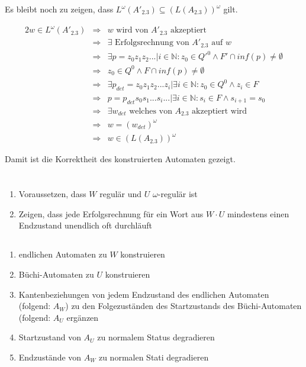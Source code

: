 \documentclass[10pt,a4paper,oneside,ngerman,numbers=noenddot]{scrartcl}
\begin{document}
	Es bleibt noch zu zeigen, dass \(L^{\omega}(A'_{2.3}) \subseteq (L(A_{2.3}))^{\omega}\) gilt.
	
	\begin{alignat*}{2}
		w \in L^{\omega}(A'_{2.3}) &\Rightarrow & w \text{ wird von \(A'_{2.3}\) akzeptiert} \\
									&\Rightarrow & \exists \text{ Erfolgsrechnung von \(A'_{2.3}\) auf \(w\)} \\
									&\Rightarrow & \exists p = z_{0}z_{1}z_{2}... | i \in \mathbb{N} : z_{0} \in Q'^{0} \wedge F' \cap inf(p) \neq \emptyset \\
									&\Rightarrow & z_{0} \in Q^{0} \wedge F \cap inf(p) \neq \emptyset \\
									&\Rightarrow & \exists p_{det} = z_{0}z_{1}z_{2}...z_{i} | \exists i \in \mathbb{N} : z_{0} \in Q^{0} \wedge z_{i} \in F \\
									&\Rightarrow & p = p_{det}s_{0}s_{1}...s_{i}... | \exists i \in \mathbb{N} : s_{i} \in F \wedge s_{i+1} = s_{0} \\
									&\Rightarrow & \exists w_{det} \text{ welches von \(A_{2.3}\) akzeptiert wird} \\
									&\Rightarrow & w = (w_{det})^{\omega} \\
									&\Rightarrow & w \in (L(A_{2.3}))^{\omega}
	\end{alignat*}
	
	Damit ist die Korrektheit des konstruierten Automaten gezeigt.
	
\section{} %
	\subsection{} %
		\begin{enumerate}
			\item Voraussetzen, dass \(W\) regulär und \(U\) \(\omega\)-regulär ist
			\item Zeigen, dass jede Erfolgsrechnung für ein Wort aus \(W \cdot U\) mindestens einen Endzustand unendlich oft durchläuft
		\end{enumerate}
	\subsection{} %
		\begin{enumerate}
			\item endlichen Automaten zu \(W\) konstruieren
			\item Büchi-Automaten zu \(U\) konstruieren
			\item Kantenbeziehungen von jedem Endzustand des endlichen Automaten (folgend: \(A_{W}\)) zu den Folgezuständen des Startzustands des Büchi-Automaten (folgend: \(A_{U}\) ergänzen
			\item Startzustand von \(A_{U}\) zu normalem Status degradieren
			\item Endzustände von \(A_{W}\) zu normalen Stati degradieren
		\end{enumerate}
\end{document}
